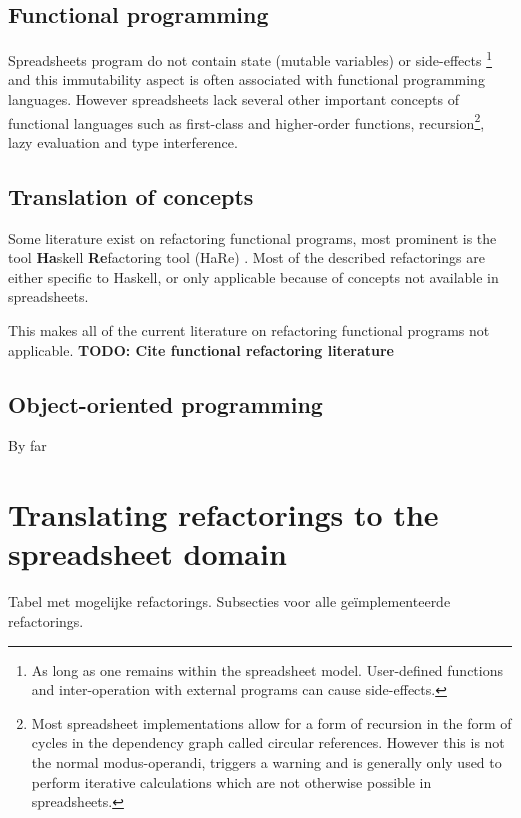 \documentclass[12pt,a4paper,onecolumn,oneside,parskip]{memoir}
\newcommand{\todo}[1]{\textbf{TODO: #1}}
\begin{document}
\subsection{Functional programming}
Spreadsheets program do not contain state (mutable variables) or side-effects
\footnote{As long as one remains within the spreadsheet model. User-defined functions and inter-operation with external programs can cause side-effects.}
and this immutability aspect is often associated with functional programming languages.
However spreadsheets lack several other important concepts of functional languages such as first-class and higher-order functions, recursion\footnote{Most spreadsheet implementations allow for a form of recursion in the form of cycles in the dependency graph called circular references. However this is not the normal modus-operandi, triggers a warning and is generally only used to perform iterative calculations which are not otherwise possible in spreadsheets.}, lazy evaluation and type interference.

\subsection{Translation of concepts}

Some literature exist on refactoring functional programs, most prominent is the tool \textbf{Ha}skell \textbf{Re}factoring tool (HaRe) \cite{thompson2005refactoring}.
Most of the described refactorings are either specific to Haskell, or only applicable because of concepts not available in spreadsheets.

This makes all of the current literature on refactoring functional programs not applicable.
\todo{Cite functional refactoring literature}

\subsection{Object-oriented programming}

By far 



\section{Translating refactorings to the spreadsheet domain}

Tabel met mogelijke refactorings.
Subsecties voor alle geïmplementeerde refactorings.


\end{document}
